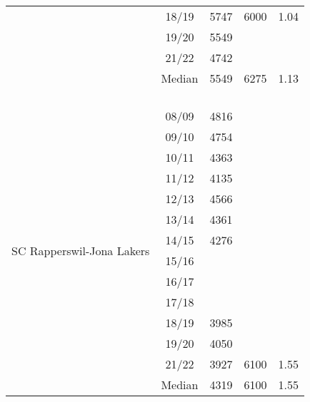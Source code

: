 \begin{longtable}[c]{p{5cm}cccc}
                                     & 18/19 & 5747 & 6000 & 1.04 \\ 
                                     & 19/20 & 5549 & ~ & ~ \\ 
                                     & 21/22 & 4742 & ~ & ~ \\ 
                                     \cmidrule{2-5}
                                     & Median & 5549 & 6275 & 1.13 \\ 
                                     \cmidrule{1-5}
    \multicolumn{5}{c}{} \\
    \multicolumn{5}{c}{} \\
    \multicolumn{5}{c}{} \\
    \multicolumn{5}{c}{} \\ 
    \multirow[t]{14}{=}{SC Rapperswil-Jona Lakers}    & 08/09 & 4816 & ~ & ~ \\ 
                                                     & 09/10 & 4754 & ~ & ~ \\ 
                                                     & 10/11 & 4363 & ~ & ~ \\ 
                                                     & 11/12 & 4135 & ~ & ~ \\ 
                                                     & 12/13 & 4566 & ~ & ~ \\ 
                                                     & 13/14 & 4361 & ~ & ~ \\ 
                                                     & 14/15 & 4276 & ~ & ~ \\ 
                                                     & 15/16 & ~ & ~ & ~ \\ 
                                                     & 16/17 & ~ & ~ & ~ \\ 
                                                     & 17/18 & ~ & ~ & ~ \\ 
                                                     & 18/19 & 3985 & ~ & ~ \\ 
                                                     & 19/20 & 4050 & ~ & ~ \\ 
                                                     & 21/22 & 3927 & 6100 & 1.55 \\ 
                                                     \cmidrule{2-5}
                                                     & Median & 4319 & 6100 & 1.55 \\ 
                                                     \cmidrule{1-5}

\end{longtable}
